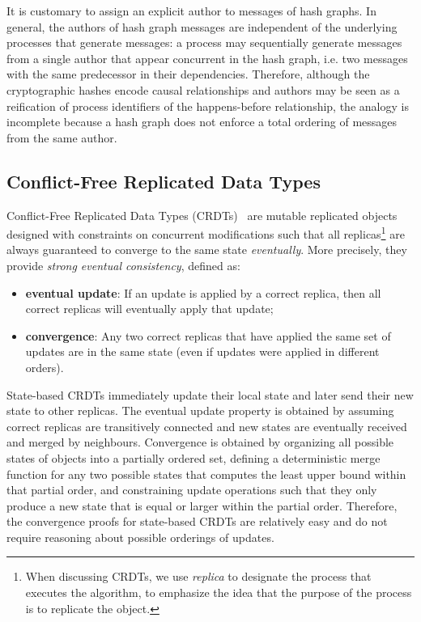 \documentclass[9pt, oneside]{article}   	%
\begin{document}
It is customary to assign an explicit author to messages of hash graphs. In general, the authors of hash graph messages are independent of the underlying processes that generate messages: a process may sequentially generate messages from a single author that appear concurrent in the hash graph, i.e. two messages with the same predecessor in their dependencies. Therefore, although the cryptographic hashes encode causal relationships and authors may be seen as a reification of process identifiers of the happens-before relationship, the analogy is incomplete because a hash graph does not enforce a total ordering of messages from the same author.

\subsection{Conflict-Free Replicated Data Types}
\label{sec:background:crdt}

Conflict-Free Replicated Data Types (CRDTs)~\cite{Shapiro2011CRDTs}  are mutable replicated objects designed with constraints on concurrent modifications such that all replicas\footnote{When discussing CRDTs, we use \textit{replica} to designate the process that executes the algorithm, to emphasize the idea that the purpose of the process is to replicate the object.} are always guaranteed to converge to the same state \textit{eventually}. More precisely, they provide \textit{strong eventual consistency}, defined as:
\begin{itemize}
	\item \textbf{eventual update}: If an update is applied by a correct replica, then all correct replicas will eventually apply that update;
	\item \textbf{convergence}: Any two correct replicas that have applied the same set of updates are in the same state (even if updates were applied in different orders).
\end{itemize} 

State-based CRDTs immediately update their local state and later send their new state to other replicas. The eventual update property is obtained by assuming correct replicas are transitively connected and new states are eventually received and merged by neighbours. Convergence is obtained by organizing all possible states of objects into a partially ordered set, defining a deterministic merge function for any two possible states that computes the least upper bound within that partial order, and constraining update operations such that they only produce a new state that is equal or larger within the partial order. Therefore, the convergence proofs for state-based CRDTs are relatively easy and do not require reasoning about possible orderings of updates.
\end{document}
